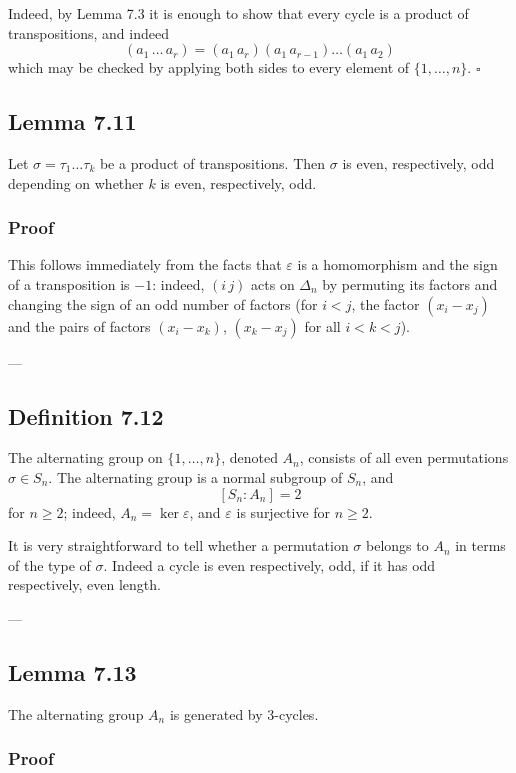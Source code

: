Indeed, by Lemma 7.3 it is enough to show that every cycle is a product of transpositions, and indeed
$$ (a_1 \, \dots \, a_r) = (a_1 \, a_r)(a_1 \, a_{r-1}) \dots (a_1 \, a_2) $$
which may be checked by applying both sides to every element of $\{1, \dots, n\}$.
\hfill $\square$

\subsection*{Lemma 7.11}

Let $\sigma = \tau_1 \dots \tau_k$ be a product of transpositions. Then $\sigma$ is even, respectively, odd depending on whether $k$ is even, respectively, odd.

\subsubsection*{Proof}

This follows immediately from the facts that $\varepsilon$ is a homomorphism and the sign of a transposition is $-1$: indeed, $(i \, j)$ acts on $\Delta_n$ by permuting its factors and changing the sign of an odd number of factors (for $i < j$, the factor $(x_i - x_j)$ and the pairs of factors $(x_i - x_k)$, $(x_k - x_j)$ for all $i < k < j$).

---

\subsection*{Definition 7.12}

The alternating group on $\{1, \dots, n\}$, denoted $A_n$, consists of all even permutations $\sigma \in S_n$.
The alternating group is a normal subgroup of $S_n$, and
$$ [S_n : A_n] = 2 $$
for $n \geq 2$; indeed, $A_n = \ker \varepsilon$, and $\varepsilon$ is surjective for $n \geq 2$.

It is very straightforward to tell whether a permutation $\sigma$ belongs to $A_n$ in terms of the type of $\sigma$. Indeed a cycle is even respectively, odd, if it has odd respectively, even length.

---

\subsection*{Lemma 7.13}

The alternating group $A_n$ is generated by 3-cycles.

\subsubsection*{Proof}

